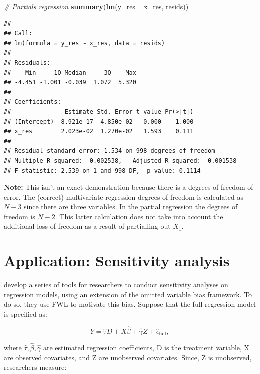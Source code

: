 \documentclass[
]{book}
\newenvironment{Shaded}{\begin{snugshade}}{\end{snugshade}}
\newcommand{\CommentTok}[1]{\textcolor[rgb]{0.56,0.35,0.01}{\textit{#1}}}
\newcommand{\KeywordTok}[1]{\textcolor[rgb]{0.13,0.29,0.53}{\textbf{#1}}}
\newcommand{\NormalTok}[1]{#1}
\newcommand{\OperatorTok}[1]{\textcolor[rgb]{0.81,0.36,0.00}{\textbf{#1}}}
\newcommand{\StringTok}[1]{\textcolor[rgb]{0.31,0.60,0.02}{#1}}
\begin{document}
\begin{Shaded}
\begin{Highlighting}[]
\CommentTok{# Partials regression}
\KeywordTok{summary}\NormalTok{(}\KeywordTok{lm}\NormalTok{(y_res }\OperatorTok{~}\StringTok{ }\NormalTok{x_res, resids))}
\end{Highlighting}
\end{Shaded}

\begin{verbatim}
## 
## Call:
## lm(formula = y_res ~ x_res, data = resids)
## 
## Residuals:
##    Min     1Q Median     3Q    Max 
## -4.451 -1.001 -0.039  1.072  5.320 
## 
## Coefficients:
##               Estimate Std. Error t value Pr(>|t|)
## (Intercept) -8.921e-17  4.850e-02   0.000    1.000
## x_res        2.023e-02  1.270e-02   1.593    0.111
## 
## Residual standard error: 1.534 on 998 degrees of freedom
## Multiple R-squared:  0.002538,	Adjusted R-squared:  0.001538 
## F-statistic: 2.539 on 1 and 998 DF,  p-value: 0.1114
\end{verbatim}

\textbf{Note:} This isn't an exact demonstration because there is a degrees of freedom of error. The (correct) multivariate regression degrees of freedom is calculated as \(N - 3\) since there are three variables. In the partial regression the degrees of freedom is \(N - 2\). This latter calculation does not take into account the additional loss of freedom as a result of partialling out \(X_1\).

\hypertarget{application-sensitivity-analysis}{%
\section{Application: Sensitivity analysis}\label{application-sensitivity-analysis}}

\citet{cinelli2020making} develop a series of tools for researchers to conduct sensitivity analyses on regression models, using an extension of the omitted variable bias framework. To do so, they use FWL to motivate this bias. Suppose that the full regression model is specified as:

\begin{equation}
    Y = \hat{\tau}D + X\hat{\beta} + \hat{\gamma}Z + \hat{\epsilon}_{\text{full}}, \label{eq:ch_full}
\end{equation}

where \(\hat{\tau}, \hat{\beta}, \hat{\gamma}\) are estimated regression coefficients, D is the treatment variable, X are observed covariates, and Z are unobserved covariates. Since, Z is unobserved, researchers measure:
\end{document}
